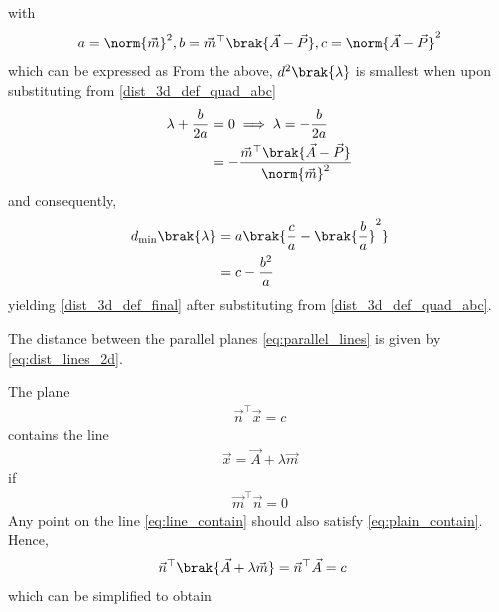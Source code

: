 with 
\begin{align}
	\label{dist_3d_def_quad_abc}
	a = \norm{\vec{m}}^2, b = \vec{m}^{\top}\brak{\vec{A} 
		-\vec{P}}, c = 
		\norm{\vec{A} -\vec{P}}^2
\end{align}
which can be expressed as 
		From the above, $d^2\brak{\lambda}$ is smallest when upon substituting from 
	\eqref{dist_3d_def_quad_abc}
\begin{align}
	\label{dist_3d_def_quad_small}
	\lambda+ \frac{b}{2a} &= 0 \implies \lambda = - \frac{b}{2a}
	\\
	&= -\frac{\vec{m}^{\top}\brak{\vec{A} 
			-\vec{P}}}
			{ \norm{\vec{m}}^2}
\end{align}
and consequently, 
\begin{align}
	d_{\min}\brak{\lambda } &=a \brak{\frac{c}{a}-\brak{\frac{b}{a}}^2 } 
	\\
	&=c - \frac{b^2}{a }
\end{align}
yielding
	\eqref{dist_3d_def_final} after substituting from 
	\eqref{dist_3d_def_quad_abc}.
\item The distance between the parallel planes 
	\eqref{eq:parallel_lines}
	is given by 
	\eqref{eq:dist_lines_2d}.
\item The plane 
		\begin{align}
		\vec{n}^{\top}
			\vec{x} = c
			\label{eq:plain_contain}
		\end{align}
		contains the line 
		\begin{align}
			\vec{x} = \vec{A}+\lambda \vec{m}
			\label{eq:line_contain}
		\end{align}
		if 
		\begin{align}
		\vec{m}^{\top}\vec{n} = 0
			\label{eq:line_plain_contain}
		\end{align}
		\solution Any point on the line 
			\eqref{eq:line_contain}
			should also satisfy 
			\eqref{eq:plain_contain}.  Hence, 
		\begin{align}
			\vec{n}^{\top}\brak{\vec{A}+\lambda \vec{m}} &= \vec{n}^{\top}\vec{A}=c
		\end{align}
		which can be simplified to obtain
